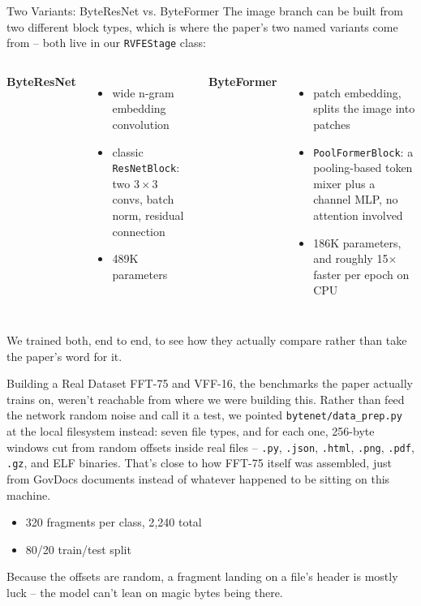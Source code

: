 \documentclass{beamer}
\begin{document}
\begin{frame}{Two Variants: ByteResNet vs. ByteFormer}
The image branch can be built from two different block types, which is
where the paper's two named variants come from -- both live in our
\texttt{RVFEStage} class:

\begin{columns}
\textbf{ByteResNet}
\begin{itemize}
    \item wide n-gram embedding convolution
    \item classic \texttt{ResNetBlock}: two $3\times3$ convs, batch norm,
    residual connection
    \item 489K parameters
\end{itemize}
\textbf{ByteFormer}
\begin{itemize}
    \item patch embedding, splits the image into patches
    \item \texttt{PoolFormerBlock}: a pooling-based token mixer plus a
    channel MLP, no attention involved
    \item 186K parameters, and roughly 15$\times$ faster per epoch on CPU
\end{itemize}
\end{columns}
\vspace{0.6em}
We trained both, end to end, to see how they actually compare rather than
take the paper's word for it.
\end{frame}

\begin{frame}{Building a Real Dataset}
FFT-75 and VFF-16, the benchmarks the paper actually trains on, weren't
reachable from where we were building this. Rather than feed the network
random noise and call it a test, we pointed
\texttt{bytenet/data\_prep.py} at the local filesystem instead: seven
file types, and for each one, 256-byte windows cut from random offsets
inside real files -- \texttt{.py}, \texttt{.json}, \texttt{.html},
\texttt{.png}, \texttt{.pdf}, \texttt{.gz}, and ELF binaries. That's
close to how FFT-75 itself was assembled, just from GovDocs documents
instead of whatever happened to be sitting on this machine.

\begin{itemize}
    \item 320 fragments per class, 2{,}240 total
    \item 80/20 train/test split
\end{itemize}
Because the offsets are random, a fragment landing on a file's header is
mostly luck -- the model can't lean on magic bytes being there.
\end{frame}
\end{document}

